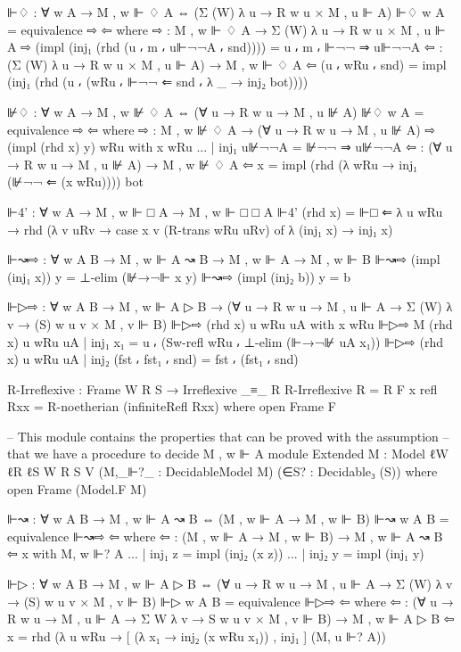 \begin{spverbatim}
  ⊩♢ : ∀ {w A} → M , w ⊩ ♢ A ⇔ (Σ (W) λ u → R w u × M , u ⊩ A)
  ⊩♢ {w} {A} = equivalence ⇨ ⇦
    where
    ⇨ : M , w ⊩ ♢ A → Σ (W) λ u → R w u × M , u ⊩ A
    ⇨ (impl (inj₁ (rhd (u ⸴ m ⸴ u⊩¬¬A ⸴ snd)))) = u ⸴ m ⸴ ⊩¬¬ ⇒ u⊩¬¬A
    ⇦ : (Σ (W) λ u → R w u × M , u ⊩ A) → M , w ⊩ ♢ A
    ⇦ (u ⸴ wRu ⸴ snd) = impl (inj₁ (rhd (u ⸴ (wRu ⸴ ⊩¬¬ ⇐ snd ⸴ λ _ → inj₂ bot))))

  ⊮♢ : ∀ {w A} → M , w ⊮ ♢ A ⇔ (∀ {u} → R w u → M , u ⊮ A)
  ⊮♢ {w} {A} = equivalence ⇨ ⇦
    where
    ⇨ : M , w ⊮ ♢ A → (∀ {u} → R w u → M , u ⊮ A)
    ⇨ (impl (rhd x) y) wRu with x wRu
    ... | inj₁ u⊮¬¬A = ⊮¬¬ ⇒ u⊮¬¬A
    ⇦ : (∀ {u} → R w u → M , u ⊮ A) → M , w ⊮ ♢ A
    ⇦ x = impl (rhd (λ wRu → inj₁ (⊮¬¬ ⇐ (x wRu)))) bot

  ⊩4' : ∀ {w A} → M , w ⊩ □ A → M , w ⊩ □ □ A
  ⊩4' (rhd x) = ⊩□ ⇐ λ {u} wRu → rhd (λ {v} uRv →
    case x {v} (R-trans wRu uRv) of λ { (inj₁ x) → inj₁ x})

  ⊩↝⇨ : ∀ {w A B} → M , w ⊩ A ↝ B → M , w ⊩ A → M , w ⊩ B
  ⊩↝⇨ (impl (inj₁ x)) y = ⊥-elim (⊮→¬⊩ x y)
  ⊩↝⇨ (impl (inj₂ b)) y = b

  ⊩▷⇨ : ∀ {w A B} → M , w ⊩ A ▷ B → (∀ {u} → R w u → M , u ⊩ A → Σ (W) λ v → (S) w u v × M , v ⊩ B)
  ⊩▷⇨ (rhd x) {u} wRu uA with x wRu
  ⊩▷⇨ {M} (rhd x) {u} wRu uA | inj₁ x₁ = u ⸴ (Sw-refl wRu ⸴ ⊥-elim (⊩→¬⊮ uA x₁))
  ⊩▷⇨ (rhd x) {u} wRu uA | inj₂ (fst ⸴ fst₁ ⸴ snd) = fst ⸴ (fst₁ ⸴ snd)

R-Irreflexive : Frame W R S → Irreflexive _≡_ R
R-Irreflexive {R = R} F {x} refl Rxx = R-noetherian (infiniteRefl Rxx)
  where open Frame F

-- This module contains the properties that can be proved with the assumption
-- that we have a procedure to decide M , w ⊩ A
module Extended
  {M : Model {ℓW} {ℓR} {ℓS} W R S V}
  (M,_⊩?_ : DecidableModel M)
  (∈S? : Decidable₃ (S))
  where
  open Frame (Model.F M)

  ⊩↝ : ∀ {w A B} → M , w ⊩ A ↝ B ⇔ (M , w ⊩ A → M , w ⊩ B)
  ⊩↝ {w} {A} {B} = equivalence ⊩↝⇨ ⇦
    where
    ⇦ : (M , w ⊩ A → M , w ⊩ B) → M , w ⊩ A ↝ B
    ⇦ x with M, w ⊩? A
    ... | inj₁ z = impl (inj₂ (x z))
    ... | inj₂ y = impl (inj₁ y)

  ⊩▷ : ∀ {w A B} → M , w ⊩ A ▷ B ⇔
    (∀ {u} → R w u → M , u ⊩ A → Σ (W) λ v → (S) w u v × M , v ⊩ B)
  ⊩▷ {w} {A} {B} = equivalence ⊩▷⇨ ⇦
    where
    ⇦ : (∀ {u} → R w u → M , u ⊩ A → Σ W λ v → S w u v × M , v ⊩ B) → M , w ⊩ A ▷ B
    ⇦ x = rhd (λ {u} wRu → [ (λ x₁ → inj₂ (x wRu x₁)) , inj₁ ] (M, u ⊩? A))


\end{spverbatim}
